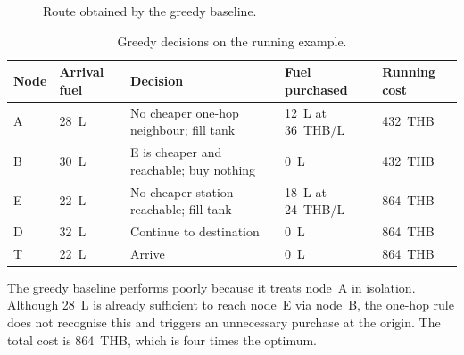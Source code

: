 \begin{figure}[ht]
\centering
{}
\caption{Route obtained by the greedy baseline.}
\label{fig:greedy_route}
\end{figure}

\begin{table}[htbp]
\centering
\caption{Greedy decisions on the running example.}
\label{tab:greedy_trace}
\small
\begin{tabular}{@{}lllll@{}}
\toprule
Node & Arrival fuel & Decision & Fuel purchased & Running cost \\
\midrule
A & 28~L & No cheaper one-hop neighbour; fill tank & 12~L at 36~THB/L & 432~THB \\
B & 30~L & E is cheaper and reachable; buy nothing & 0~L & 432~THB \\
E & 22~L & No cheaper station reachable; fill tank & 18~L at 24~THB/L & 864~THB \\
D & 32~L & Continue to destination & 0~L & 864~THB \\
T & 22~L & Arrive & 0~L & 864~THB \\
\bottomrule
\end{tabular}
\end{table}

The greedy baseline performs poorly because it treats node~A in isolation. Although 28~L is already sufficient to reach node~E via node~B, the one-hop rule does not recognise this and triggers an unnecessary purchase at the origin. The total cost is 864~THB, which is four times the optimum.

